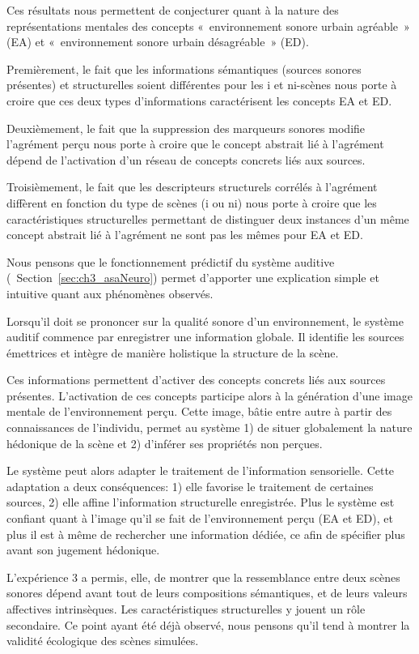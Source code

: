Ces résultats nous permettent de conjecturer quant à la nature des représentations mentales des concepts «~environnement sonore urbain agréable~» (EA) et «~environnement sonore urbain désagréable~» (ED). 

Premièrement, le fait que les informations sémantiques (sources sonores présentes) et structurelles soient différentes pour les i et ni-scènes nous porte à croire que ces deux types d'informations caractérisent les concepts EA et ED. 

Deuxièmement, le fait que la suppression des marqueurs sonores modifie l'agrément perçu nous porte à croire que le concept abstrait lié à l'agrément dépend de l'activation d'un réseau de concepts concrets liés aux sources.

Troisièmement, le fait que les descripteurs structurels corrélés à l'agrément diffèrent en fonction du type de scènes (i ou ni) nous porte à croire que les caractéristiques structurelles permettant de distinguer deux instances d'un même concept abstrait lié à l'agrément ne sont pas les mêmes pour EA et ED.

Nous pensons que le fonctionnement prédictif du système auditive (\cf~Section~\ref{sec:ch3_asaNeuro}) permet d'apporter une explication simple et intuitive quant aux phénomènes observés. 

Lorsqu'il doit se prononcer sur la qualité sonore d'un environnement, le système auditif commence par enregistrer une information globale. Il identifie les sources émettrices et intègre de manière holistique la structure de la scène. 

Ces informations permettent d'activer des concepts concrets liés aux sources présentes. L'activation de ces concepts participe alors à la génération d'une image mentale de l'environnement perçu. Cette image, bâtie entre autre à partir des connaissances de l'individu, permet au système 1) de situer globalement la nature hédonique de la scène et 2) d'inférer ses propriétés non perçues. 

Le système peut alors adapter le traitement de l'information sensorielle. Cette adaptation a deux conséquences: 1) elle favorise le traitement de certaines sources, 2) elle affine l'information structurelle enregistrée. Plus le système est confiant quant à l'image qu'il se fait de l'environnement perçu (EA et ED), et plus il est à même de rechercher une information dédiée, ce afin de spécifier plus avant son jugement hédonique.

L'expérience 3 a permis, elle, de montrer que la ressemblance entre deux scènes sonores dépend avant tout de leurs compositions sémantiques, et de leurs valeurs affectives intrinsèques. Les caractéristiques structurelles y jouent un rôle secondaire. Ce point ayant été déjà observé, nous pensons qu'il tend à montrer la validité écologique des scènes simulées.

